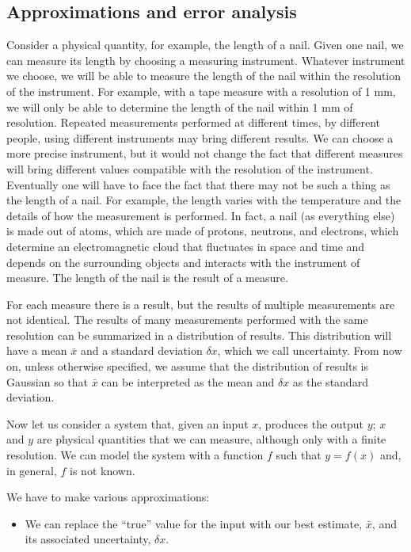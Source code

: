 \documentclass[justified, sixbynine]{tufte-book}
\theoremstyle{plain}%
\newtheorem * {corollary}{Corollary}
\theoremstyle{definition}
\theoremstyle{remark}
\newtheorem * {remark}{Remark}
\newtheorem * {note}{Note}
\begin{document}
\begin{fullwidth}
\goodbreak\section{Approximations and error analysis}


Consider a physical quantity, for example, the length of a nail. Given one nail, we can measure its length by choosing a measuring instrument. Whatever instrument we choose, we will be able to measure the length of the nail within the resolution of the instrument. For example, with a tape measure with a resolution of 1 mm, we will only be able to determine the length of the nail within 1 mm of resolution. Repeated measurements performed at different times, by different people, using different instruments may bring different results. We can choose a more precise instrument, but it would not change the fact that different measures will bring different values compatible with the resolution of the instrument. Eventually one will have to face the fact that there may not be such a thing as the length of a nail. For example, the length varies with the temperature and the details of how the measurement is performed. In fact, a nail (as everything else) is made out of atoms, which are made of protons, neutrons, and electrons, which determine an electromagnetic cloud that fluctuates in space and time and depends on the surrounding objects and interacts with the instrument of measure. The length of the nail is the result of a measure.

For each measure there is a result, but the results of multiple measurements are not identical. The results of many measurements performed with the same resolution can be summarized in a distribution of results. This distribution will have a mean $\bar x$ and a standard deviation $\delta x$, which we call uncertainty. From now on, unless otherwise specified, we assume that the distribution of results is Gaussian so that $\bar x$ can be interpreted as the mean and $\delta x$ as the standard deviation.

Now let us consider a system that, given an input $x$, produces the output $y$; $x$ and $y$ are physical quantities that we can measure, although only with a finite resolution. We can model the system with a function $f$ such that $y = f(x)$ and, in general, $f$ is not known.

We have to make various approximations:
\begin{itemize}
\item We can replace the ``true'' value for the input with our best estimate, $\bar x$, and its associated uncertainty, $\delta x$.


\end{itemize}
\end{fullwidth}
\end{document}
